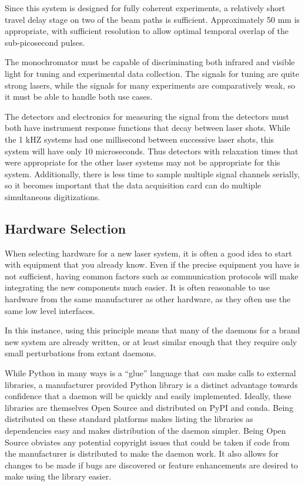 Since this system is designed for fully coherent experiments, a relatively short travel delay stage on two of the beam paths is sufficient.
Approximately 50 mm is appropriate, with sufficient resolution to allow optimal temporal overlap of the sub-picosecond pulses.

The monochromator must be capable of discriminating both infrared and visible light for tuning and experimental data collection.
The signals for tuning are quite strong lasers, while the signals for many experiments are comparatively weak, so it must be able to handle both use cases.

The detectors and electronics for measuring the signal from the detectors must both have instrument response functions that decay between laser shots.
While the 1 kHZ systems had one millisecond between successive laser shots, this system will have only 10 microseconds.
Thus detectors with relaxation times that were appropriate for the other laser systems may not be appropriate for this system.
Additionally, there is less time to sample multiple signal channels serially, so it becomes important that the data acquisition card can do multiple simultaneous digitizations.


\subsection{Hardware Selection}

When selecting hardware for a new laser system, it is often a good idea to start with equipment that you already know.
Even if the precise equipment you have is not sufficient, having common factors such as communication protocols will make integrating the new components much easier.
It is often reasonable to use hardware from the same manufacturer as other hardware, as they often use the same low level interfaces.

In this instance, using this principle means that many of the \yaq{} daemons for a brand new system are already written, or at least similar enough that they require only small perturbations from extant daemons.

While Python in many ways is a ``glue'' language that \textit{can} make calls to external libraries, a manufacturer provided Python library is a distinct advantage towards confidence that a \yaq{} daemon will be quickly and easily implemented.
Ideally, these libraries are themselves Open Source and distributed on PyPI\cite{PyPI} and conda\cite{conda}.
Being distributed on these standard platforms makes listing the libraries as dependencies easy and makes distribution of the \yaq{} daemon simpler.
Being Open Source obviates any potential copyright issues that could be taken if code from the manufacturer is distributed to make the \yaq{} daemon work.
It also allows for changes to be made if bugs are discovered or feature enhancements are desired to make using the library easier.

